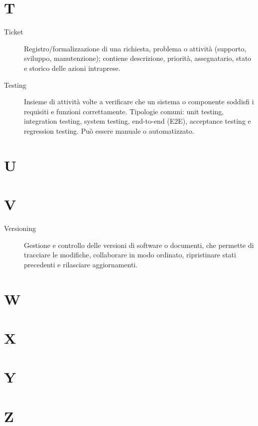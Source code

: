 \section*{T}
\begin{description}
    \item[Ticket] Registro/formalizzazione di una richiesta, problema o attività (supporto, sviluppo, manutenzione); contiene descrizione, priorità, assegnatario, stato e storico delle azioni intraprese.
    \item[Testing] Insieme di attività volte a verificare che un sistema o componente soddisfi i requisiti e funzioni correttamente. Tipologie comuni: unit testing, integration testing, system testing, end-to-end (E2E), acceptance testing e regression testing. Può essere manuale o automatizzato.
\end{description}

\section*{U}



\section*{V}
\begin{description}
    \item[Versioning] Gestione e controllo delle versioni di software o documenti, che permette di tracciare le modifiche, collaborare in modo ordinato, ripristinare stati precedenti e rilasciare aggiornamenti.
\end{description}


\section*{W}


\section*{X}


\section*{Y}


\section*{Z}
